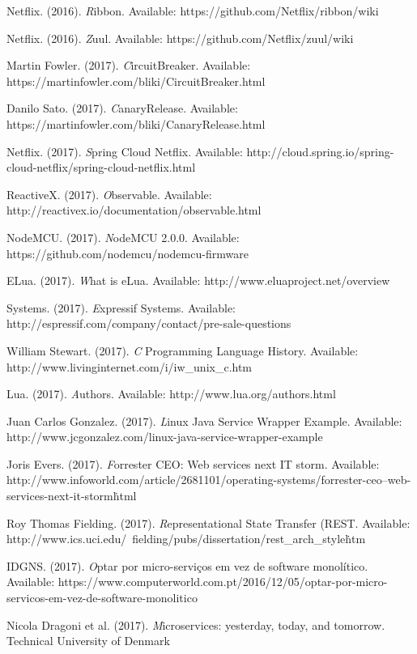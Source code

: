 \documentclass[journal]{IEEEtran}
\begin{document}
\begin{thebibliography}{1}
Netflix. (2016). \emph Ribbon. Available: https://github.com/Netflix/ribbon/wiki 

Netflix. (2016). \emph Zuul. Available: https://github.com/Netflix/zuul/wiki 

Martin Fowler. (2017). \emph CircuitBreaker. Available: https://martinfowler.com/bliki/CircuitBreaker.html 

Danilo Sato. (2017). \emph CanaryRelease. Available: https://martinfowler.com/bliki/CanaryRelease.html 

Netflix. (2017). \emph Spring Cloud Netflix. Available: http://cloud.spring.io/spring-cloud-netflix/spring-cloud-netflix.html 

ReactiveX. (2017). \emph Observable. Available: http://reactivex.io/documentation/observable.html 

NodeMCU. (2017). \emph NodeMCU 2.0.0. Available: https://github.com/nodemcu/nodemcu-firmware 

ELua. (2017). \emph What is eLua. Available: http://www.eluaproject.net/overview 

Systems. (2017). \emph Expressif Systems. Available: http://espressif.com/company/contact/pre-sale-questions 

William Stewart. (2017). \emph C Programming Language History. Available: http://www.livinginternet.com/i/iw\_unix\_c.htm 

Lua. (2017). \emph Authors. Available: http://www.lua.org/authors.html 

Juan Carlos Gonzalez. (2017). \emph Linux Java Service Wrapper Example. Available: http://www.jcgonzalez.com/linux-java-service-wrapper-example 

Joris Evers. (2017). \emph Forrester CEO: Web services next IT storm. Available: http://www.infoworld.com/article/2681101/operating-systems/forrester-ceo--web-services-next-it-storm\.html 

Roy Thomas Fielding. (2017). \emph Representational State Transfer (REST. Available: http://www.ics.uci.edu/~fielding/pubs/dissertation/rest\_arch\_style\.htm 

IDGNS. (2017). \emph Optar por micro-serviços em vez de software monolítico. Available: https://www.computerworld.com.pt/2016/12/05/optar-por-micro-servicos-em-vez-de-software-monolitico

Nicola Dragoni et al. (2017). \emph Microservices: yesterday, today, and tomorrow. Technical University of Denmark

\end{thebibliography}
\end{document}
